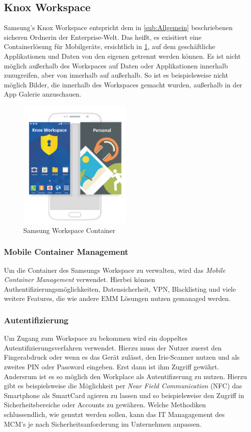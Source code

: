 \subsection{Knox Workspace}
Samsung's Knox Workspace entspricht dem in \cref{sub:Allgemein} beschriebenen \flqq sicheren Ordner\frqq in der Enterprise-Welt. Das heißt, es exisitiert eine Containerlösung für Mobilgeräte, ersichtlich in \cref{fig:SamKno2}, auf dem geschäftliche Applikationen und Daten von den eigenen getrennt werden können. Es ist nicht möglich außerhalb des Workspaces auf Daten oder Applikationen innerhalb zuzugreifen, aber von innerhalb auf außerhalb. So ist es beispielsweise nicht möglich Bilder, die innerhalb des Workspaces gemacht wurden, außerhalb in der App Galerie anzuschauen.
\begin{figure}[hbt]
\centering
\includegraphics[width=0.5\textwidth]{Bilder/sk_2}
\caption{Samsung Workspace Container}\label{fig:SamKno2}
\end{figure}

\subsubsection{Mobile Container Management}
Um die Container des Samsungs Workspace zu verwalten, wird das \textit{Mobile Container Management} verwendet. Hierbei können Authentifizierungsmöglichkeiten, Datensicherheit,  VPN, Blacklisting und viele weitere Features, die wie andere EMM Lösungen nutzen gemanaged werden.

\subsubsection{Autentifizierung}
Um Zugang zum Workspace zu bekommen wird ein doppeltes Autentifizierungsverfahren verwendet. Hierzu muss der Nutzer zuerst den Fingerabdruck oder wenn es das Gerät zulässt, den Iris-Scanner nutzen und als zweites PIN oder Password eingeben. Erst dann ist ihm Zugriff gewährt.
Andersrum ist es so möglich den Workplace als Autentifizerung zu nutzen. Hierzu gibt es beispielsweise die Möglichkeit per \textit{Near Field Communication} (NFC) das Smartphone als SmartCard agieren zu lassen und so beispielsweise den Zugriff in Sicherheitsbereiche oder Accounts zu gewähren.
Welche Methodiken schlussendlich, wie genutzt werden sollen, kann das IT Managagement des MCM's je nach Sicherheitsanforderung im Unternehmen anpassen.

